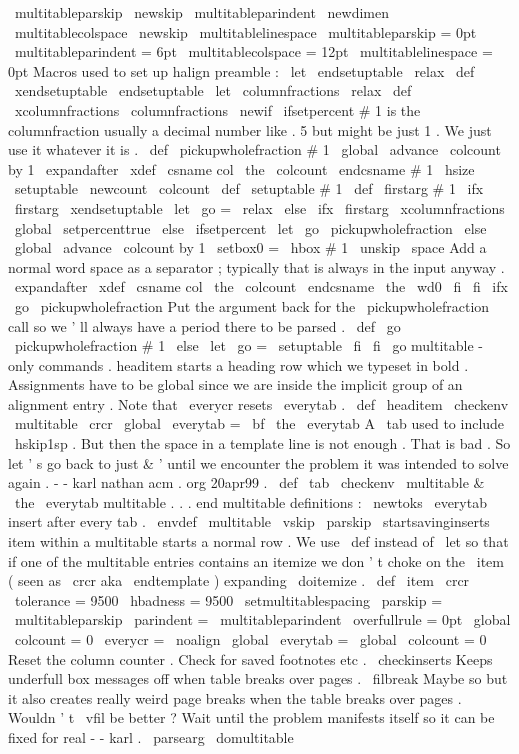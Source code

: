 \
multitableparskip
\
newskip
\
multitableparindent
\
newdimen
\
multitablecolspace
\
newskip
\
multitablelinespace
\
multitableparskip
=
0pt
\
multitableparindent
=
6pt
\
multitablecolspace
=
12pt
\
multitablelinespace
=
0pt
%
Macros
used
to
set
up
halign
preamble
:
%
\
let
\
endsetuptable
\
relax
\
def
\
xendsetuptable
{
\
endsetuptable
}
\
let
\
columnfractions
\
relax
\
def
\
xcolumnfractions
{
\
columnfractions
}
\
newif
\
ifsetpercent
%
#
1
is
the
columnfraction
usually
a
decimal
number
like
.
5
but
might
%
be
just
1
.
We
just
use
it
whatever
it
is
.
%
\
def
\
pickupwholefraction
#
1
{
%
\
global
\
advance
\
colcount
by
1
\
expandafter
\
xdef
\
csname
col
\
the
\
colcount
\
endcsname
{
#
1
\
hsize
}
%
\
setuptable
}
\
newcount
\
colcount
\
def
\
setuptable
#
1
{
%
\
def
\
firstarg
{
#
1
}
%
\
ifx
\
firstarg
\
xendsetuptable
\
let
\
go
=
\
relax
\
else
\
ifx
\
firstarg
\
xcolumnfractions
\
global
\
setpercenttrue
\
else
\
ifsetpercent
\
let
\
go
\
pickupwholefraction
\
else
\
global
\
advance
\
colcount
by
1
\
setbox0
=
\
hbox
{
#
1
\
unskip
\
space
}
%
Add
a
normal
word
space
as
a
%
separator
;
typically
that
is
always
in
the
input
anyway
.
\
expandafter
\
xdef
\
csname
col
\
the
\
colcount
\
endcsname
{
\
the
\
wd0
}
%
\
fi
\
fi
\
ifx
\
go
\
pickupwholefraction
%
Put
the
argument
back
for
the
\
pickupwholefraction
call
so
%
we
'
ll
always
have
a
period
there
to
be
parsed
.
\
def
\
go
{
\
pickupwholefraction
#
1
}
%
\
else
\
let
\
go
=
\
setuptable
\
fi
%
\
fi
\
go
}
%
multitable
-
only
commands
.
%
%
headitem
starts
a
heading
row
which
we
typeset
in
bold
.
%
Assignments
have
to
be
global
since
we
are
inside
the
implicit
group
%
of
an
alignment
entry
.
Note
that
\
everycr
resets
\
everytab
.
\
def
\
headitem
{
\
checkenv
\
multitable
\
crcr
\
global
\
everytab
=
{
\
bf
}
\
the
\
everytab
}
%
%
%
A
\
tab
used
to
include
\
hskip1sp
.
But
then
the
space
in
a
template
%
line
is
not
enough
.
That
is
bad
.
So
let
'
s
go
back
to
just
&
'
until
%
we
encounter
the
problem
it
was
intended
to
solve
again
.
%
-
-
karl
nathan
acm
.
org
20apr99
.
\
def
\
tab
{
\
checkenv
\
multitable
&
\
the
\
everytab
}
%
%
multitable
.
.
.
end
multitable
definitions
:
%
\
newtoks
\
everytab
%
insert
after
every
tab
.
%
\
envdef
\
multitable
{
%
\
vskip
\
parskip
\
startsavinginserts
%
%
item
within
a
multitable
starts
a
normal
row
.
%
We
use
\
def
instead
of
\
let
so
that
if
one
of
the
multitable
entries
%
contains
an
itemize
we
don
'
t
choke
on
the
\
item
(
seen
as
\
crcr
aka
%
\
endtemplate
)
expanding
\
doitemize
.
\
def
\
item
{
\
crcr
}
%
%
\
tolerance
=
9500
\
hbadness
=
9500
\
setmultitablespacing
\
parskip
=
\
multitableparskip
\
parindent
=
\
multitableparindent
\
overfullrule
=
0pt
\
global
\
colcount
=
0
%
\
everycr
=
{
%
\
noalign
{
%
\
global
\
everytab
=
{
}
%
\
global
\
colcount
=
0
%
Reset
the
column
counter
.
%
Check
for
saved
footnotes
etc
.
\
checkinserts
%
Keeps
underfull
box
messages
off
when
table
breaks
over
pages
.
%
\
filbreak
%
Maybe
so
but
it
also
creates
really
weird
page
breaks
when
the
%
table
breaks
over
pages
.
Wouldn
'
t
\
vfil
be
better
?
Wait
until
the
%
problem
manifests
itself
so
it
can
be
fixed
for
real
-
-
karl
.
}
%
}
%
%
\
parsearg
\
domultitable
}
